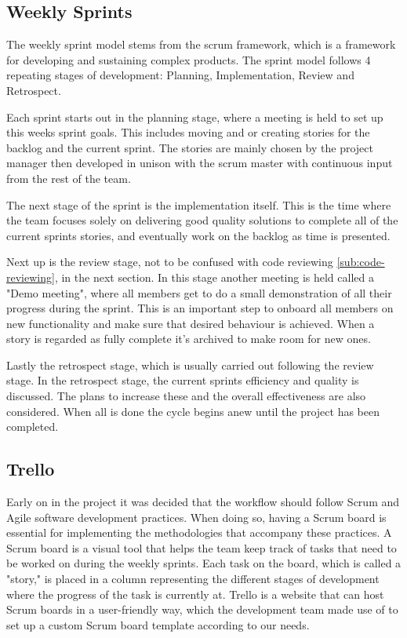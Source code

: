     \subsection{Weekly Sprints} \label{sub:weekly-sprints}
        The weekly sprint model stems from the scrum framework, which is a framework for developing and sustaining complex products. The sprint model follows 4 repeating stages of development: Planning, Implementation, Review and Retrospect.
    
        Each sprint starts out in the planning stage, where a meeting is held to set up this weeks sprint goals. This includes moving and or creating stories for the backlog and the current sprint. The stories are mainly chosen by the project manager then developed in unison with the scrum master with continuous input from the rest of the team.
    
        The next stage of the sprint is the implementation itself. This is the time where the team focuses solely on delivering good quality solutions to complete all of the current sprints stories, and eventually work on the backlog as time is presented.
    
        Next up is the review stage, not to be confused with code reviewing \ref{sub:code-reviewing}, in the next section. In this stage another meeting is held called a "Demo meeting", where all members get to do a small demonstration of all their progress during the sprint. This is an important step to onboard all members on new functionality and make sure that desired behaviour is achieved. When a story is regarded as fully complete it's archived to make room for new ones.
    
        Lastly the retrospect stage, which is usually carried out following the review stage. In the retrospect stage, the current sprints efficiency and quality is discussed. The plans to increase these and the overall effectiveness are also considered. When all is done the cycle begins anew until the project has been completed.

    \subsection{Trello}
        Early on in the project it was decided that the workflow should follow Scrum and Agile software development practices. When doing so, having a Scrum board is essential for implementing the methodologies that accompany these practices. A Scrum board is a visual tool that helps the team keep track of tasks that need to be worked on during the weekly sprints. Each task on the board, which is called a "story," is placed in a column representing the different stages of development where the progress of the task is currently at. Trello\cite{trello} is a website that can host Scrum boards in a user-friendly way, which the development team made use of to set up a custom Scrum board template according to our needs. 


